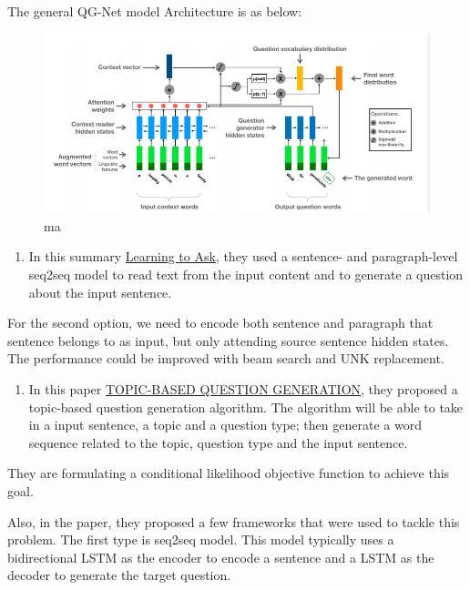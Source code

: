 \documentclass[]{book}
\providecommand{\tightlist}{%
  \setlength{\itemsep}{0pt}\setlength{\parskip}{0pt}}
\theoremstyle{definition}
\theoremstyle{definition}
\theoremstyle{definition}
\theoremstyle{remark}
\begin{document}
The general QG-Net model Architecture is as below:

\begin{figure}
\centering
\includegraphics{img/qgnet.png}
\caption{ma}
\end{figure}

\begin{enumerate}
\def\labelenumi{\arabic{enumi}.}
\setcounter{enumi}{1}
\tightlist
\item
  In this summary
  \href{http://www.cs.cornell.edu/~xdu/papers/acl17_dsc_poster.pdf}{Learning
  to Ask}, they used a sentence- and paragraph-level seq2seq model to
  read text from the input content and to generate a question about the
  input sentence.
\end{enumerate}

For the second option, we need to encode both sentence and paragraph
that sentence belongs to as input, but only attending source sentence
hidden states. The performance could be improved with beam search and
UNK replacement.

\begin{enumerate}
\def\labelenumi{\arabic{enumi}.}
\setcounter{enumi}{2}
\tightlist
\item
  In this paper
  \href{https://openreview.net/pdf?id=rk3pnae0b}{TOPIC-BASED QUESTION
  GENERATION}, they proposed a topic-based question generation
  algorithm. The algorithm will be able to take in a input sentence, a
  topic and a question type; then generate a word sequence related to
  the topic, question type and the input sentence.
\end{enumerate}

They are formulating a conditional likelihood objective function to
achieve this goal.

Also, in the paper, they proposed a few frameworks that were used to
tackle this problem. The first type is seq2seq model. This model
typically uses a bidirectional LSTM as the encoder to encode a sentence
and a LSTM as the decoder to generate the target question.
\end{document}
